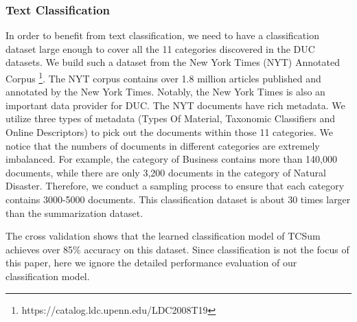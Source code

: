 \documentclass[letterpaper]{article}
\begin{document}
\subsubsection{Text Classification}
In order to benefit from text classification, we need to have a classification dataset large enough to cover all the 11 categories discovered in the DUC datasets.
We build such a dataset from the New York Times (NYT) Annotated Corpus \footnote{https://catalog.ldc.upenn.edu/LDC2008T19}.
The NYT corpus contains over 1.8 million articles published and annotated by the New York Times.
Notably, the New York Times is also an important data provider for DUC.
The NYT documents have rich metadata. 
We utilize three types of metadata (Types Of Material, Taxonomic Classifiers and Online Descriptors) to pick out the documents within those 11 categories.
We notice that the numbers of documents in different categories are extremely imbalanced.
For example, the category of Business contains more than 140,000 documents, while there are only 3,200 documents in the category of Natural Disaster.
Therefore, we conduct a sampling process to ensure that each category contains 3000-5000 documents. 
This classification dataset is about 30 times larger than the summarization dataset.

The cross validation shows that the learned classification model of TCSum achieves over 85\% accuracy on this dataset.
Since classification is not the focus of this paper, here we ignore the detailed performance evaluation of our classification model.

\end{document}

